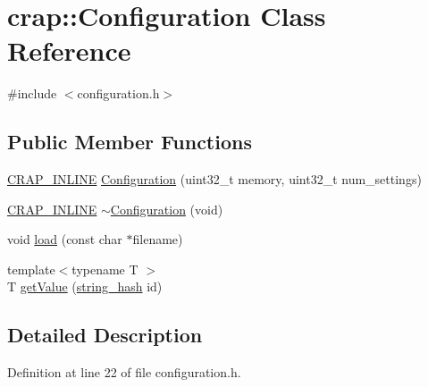 \hypertarget{classcrap_1_1_configuration}{\section{crap\+:\+:Configuration Class Reference}
\label{classcrap_1_1_configuration}
}


{\ttfamily \#include $<$configuration.\+h$>$}

\subsection*{Public Member Functions}
\begin{DoxyCompactItemize}
\item 
\hyperlink{config__x86_8h_a5a40526b8d842e7ff731509998bb0f1c}{C\+R\+A\+P\+\_\+\+I\+N\+L\+I\+N\+E} \hyperlink{classcrap_1_1_configuration_ae4d55c44ced64675a8d628309412fd4d}{Configuration} (uint32\+\_\+t memory, uint32\+\_\+t num\+\_\+settings)
\item 
\hyperlink{config__x86_8h_a5a40526b8d842e7ff731509998bb0f1c}{C\+R\+A\+P\+\_\+\+I\+N\+L\+I\+N\+E} \hyperlink{classcrap_1_1_configuration_a26af296814f58eef2bd518d60faae1ba}{$\sim$\+Configuration} (void)
\item 
void \hyperlink{classcrap_1_1_configuration_a279b4f6136af08abb47bbd803cf1cce8}{load} (const char $\ast$filename)
\item 
{\footnotesize template$<$typename T $>$ }\\T \hyperlink{classcrap_1_1_configuration_a427c9acd9a6e1b99dc647cc56c48ac40}{get\+Value} (\hyperlink{classcrap_1_1string__hash}{string\+\_\+hash} id)
\end{DoxyCompactItemize}


\subsection{Detailed Description}


Definition at line 22 of file configuration.\+h.



